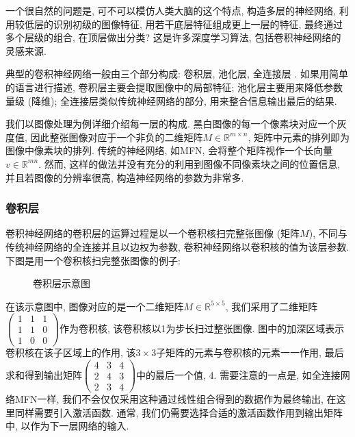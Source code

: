 \documentclass[lang=cn, 11pt,   a4paper]{elegantpaper}
\begin{document}
一个很自然的问题是, 可不可以模仿人类大脑的这个特点, 构造多层的神经网络, 利用较低层的识别初级的图像特征, 用若干底层特征组成更上一层的特征, 最终通过多个层级的组合, 在顶层做出分类? 这是许多深度学习算法, 包括卷积神经网络的灵感来源.

典型的卷积神经网络一般由三个部分构成:  卷积层, 池化层, 全连接层 \cite{khan18}. 如果用简单的语言进行描述, 卷积层主要会提取图像中的局部特征; 池化层主要用来降低参数量级 (降维); 全连接层类似传统神经网络的部分, 用来整合信息输出最后的结果. 

我们以图像处理为例详细介绍每一层的构成. 黑白图像的每一个像素块对应一个灰度值, 因此整张图像对应于一个非负的二维矩阵$M\in \mathbb{R}^{m\times n}$, 矩阵中元素的排列即为图像中像素块的排列. 传统的神经网络, 如MFN, 会将整个矩阵视作一个长向量$v\in \mathbb{R}^{mn}$. 然而, 这样的做法并没有充分的利用到图像不同像素块之间的位置信息, 并且若图像的分辨率很高, 构造神经网络的参数为非常多.

\subsubsection{卷积层}
卷积神经网络的卷积层的运算过程是以一个卷积核扫完整张图像 (矩阵$M$), 不同与传统神经网络的全连接并且以边权为参数, 卷积神经网络以卷积核的值为该层参数. 下图是用一个卷积核扫完整张图像的例子: 
\begin{figure}[H]
\caption{卷积层示意图}
\end{figure}

在该示意图中, 图像对应的是一个二维矩阵$M \in \mathbb{R}^{5\times 5}$, 我们采用了二维矩阵$\left (\begin{array}{lll}{1} & {1} & {1} \\ {1} & {1} & {0} \\ {1} & {0} & {0}\end{array}\right)$作为卷积核, 该卷积核以1为步长扫过整张图像. 图中的加深区域表示卷积核在该子区域上的作用, 该$3\times3$子矩阵的元素与卷积核的元素一一作用, 最后求和得到输出矩阵$\left (\begin{array}{lll}{4} & {3} & {4} \\ {2} & {4} & {3} \\ {2} & {3} & {4}\end{array}\right)$中的最后一个值, 4. 需要注意的一点是, 如全连接网络MFN一样, 我们不会仅仅采用这种通过线性组合得到的数据作为最终输出, 在这里同样需要引入激活函数. 通常, 我们仍需要选择合适的激活函数作用到输出矩阵中, 以作为下一层网络的输入.
\end{document}
